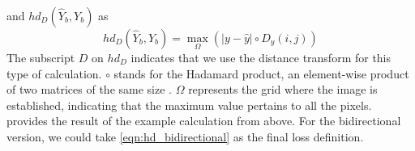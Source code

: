 and $hd_D(\hat{Y}_b,Y_b)$ as
\begin{equation}
    hd_D(\hat{Y}_b,Y_b)=\mathop{\max}_{\Omega}(|y-\hat{y}|\circ D_{y}(i,j))
\end{equation}
The subscript $D$ on $hd_D$ indicates that we use the distance transform for this type of calculation. $\circ$ stands for the Hadamard product, an element-wise product of two matrices of the same size \cite{horn1990hadamard}. $\Omega$ represents the grid where the image is established, indicating that the maximum value pertains to all the pixels.  provides the result of the example calculation from above. For the bidirectional version, we could take \ref{eqn:hd_bidirectional} as the final loss definition.
\begin{figure}[H]%
    \centering

\end{figure}
